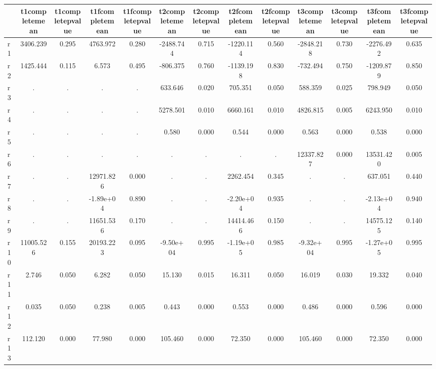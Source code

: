 \begin{table}[htbp]
\begin{tabular}{lcccccccccccc} \hline \hline
 & t1completemean  & t1completepvalue  & t1fcompletemean  & t1fcompletepvalue  & t2completemean  & t2completepvalue  & t2fcompletemean  & t2fcompletepvalue  & t3completemean  & t3completepvalue  & t3fcompletemean  & t3fcompletepvalue  \\  \hline 
r1 &  3406.239 &     0.295 &  4763.972 &     0.280 & -2488.744 &     0.715 & -1220.114 &     0.560 & -2848.218 &     0.730 & -2276.492 &     0.635 \\  
r2 &  1425.444 &     0.115 &     6.573 &     0.495 &  -806.375 &     0.760 & -1139.198 &     0.830 &  -732.494 &     0.750 & -1209.879 &     0.850 \\  
r3 &         . &         . &         . &         . &   633.646 &     0.020 &   705.351 &     0.050 &   588.359 &     0.025 &   798.949 &     0.050 \\  
r4 &         . &         . &         . &         . &  5278.501 &     0.010 &  6660.161 &     0.010 &  4826.815 &     0.005 &  6243.950 &     0.010 \\  
r5 &         . &         . &         . &         . &     0.580 &     0.000 &     0.544 &     0.000 &     0.563 &     0.000 &     0.538 &     0.000 \\  
r6 &         . &         . &         . &         . &         . &         . &         . &         . & 12337.827 &     0.000 & 13531.420 &     0.005 \\  
r7 &         . &         . & 12971.826 &     0.000 &         . &         . &  2262.454 &     0.345 &         . &         . &   637.051 &     0.440 \\  
r8 &         . &         . & -1.89e+04 &     0.890 &         . &         . & -2.20e+04 &     0.935 &         . &         . & -2.13e+04 &     0.940 \\  
r9 &         . &         . & 11651.536 &     0.170 &         . &         . & 14414.466 &     0.150 &         . &         . & 14575.125 &     0.140 \\  
r10 & 11005.526 &     0.155 & 20193.223 &     0.095 & -9.50e+04 &     0.995 & -1.19e+05 &     0.985 & -9.32e+04 &     0.995 & -1.27e+05 &     0.995 \\  
r11 &     2.746 &     0.050 &     6.282 &     0.050 &    15.130 &     0.015 &    16.311 &     0.050 &    16.019 &     0.030 &    19.332 &     0.040 \\  
r12 &     0.035 &     0.050 &     0.238 &     0.005 &     0.443 &     0.000 &     0.553 &     0.000 &     0.486 &     0.000 &     0.596 &     0.000 \\  
r13 &   112.120 &     0.000 &    77.980 &     0.000 &   105.460 &     0.000 &    72.350 &     0.000 &   105.460 &     0.000 &    72.350 &     0.000 \\  
\hline \hline \end{tabular}
\end{table}
